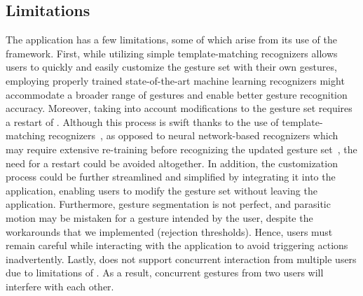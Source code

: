 \subsection{Limitations} \label{sec:lui:discussion:limitations}
The \lui application has a few limitations, some of which arise from its use of the \ql framework.
%
First, while utilizing simple template-matching recognizers allows users to quickly and easily customize the \lui gesture set with their own gestures, employing properly trained state-of-the-art machine learning recognizers might accommodate a broader range of gestures and enable better gesture recognition accuracy. 
Moreover, taking into account modifications to the gesture set requires a restart of \ql. Although this process is swift thanks to the use of template-matching recognizers~\cite{Brunelli:2009}, as opposed to neural network-based recognizers which may require extensive re-training before recognizing the updated gesture set~\cite{Brunelli:2009}, the need for a restart could be avoided altogether. 
%
In addition, the customization process could be further streamlined and simplified by integrating it into the \lui application, enabling users to modify the gesture set without leaving the application.
Furthermore, gesture segmentation is not perfect, and parasitic motion may be mistaken for a gesture intended by the user, despite the workarounds that we implemented (\eg rejection thresholds). Hence, users must remain careful while interacting with the application to avoid triggering actions inadvertently.
Lastly, \lui does not support concurrent interaction from multiple users due to limitations of \ql. As a result, concurrent gestures from two users will interfere with each other.

